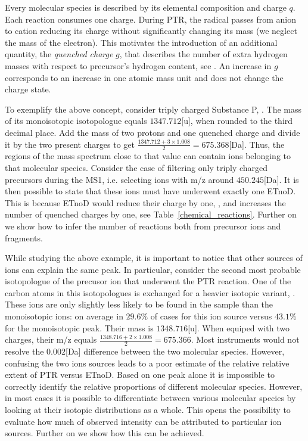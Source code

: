 \documentclass[journal=ancham, manuscript=article, layout=twocolumn]{achemso}
\begin{document}
Every molecular species is described by its elemental composition and charge $q$. 
Each reaction consumes one charge.
During PTR, the radical passes from anion to cation reducing its charge without significantly changing its mass (we neglect the mass of the electron). 
This motivates the introduction of an additional quantity, the \textit{quenched charge} $g$, that describes the number of extra hydrogen masses with respect to precursor's hydrogen content, see \citet{lermyte2015understanding}.
An increase in $g$ corresponds to an increase in one atomic mass unit and does not change the charge state. 

To exemplify the above concept, consider triply charged Substance P, . 
The mass of its monoisotopic isotopologue equals $1347.712$[u], when rounded to the third decimal place.
Add the mass of two protons and one quenched charge and divide it by the two present charges to get $\frac{1347.712 + 3 \times 1.008}{2} = 675.368$[Da].
Thus, the regions of the mass spectrum close to that value can contain ions belonging to that molecular species.
Consider the case of filtering only triply charged precursors during the MS1, i.e. selecting ions with m/z around $450.245$[Da]. 
It is then possible to state that these ions must have underwent exactly one ETnoD.
This is because ETnoD would reduce their charge by one, , and increases the number of quenched charges by one, see Table~\ref{chemical_reactions}.
Further on we show how to infer the number of reactions both from precursor ions and fragments.

While studying the above example, it is important to notice that other sources of ions can explain the same peak.
In particular, consider the second most probable isotopologue of the precusor ion that underwent the PTR reaction.
One of the  carbon atoms in this isotopologues is exchanged for a heavier isotopic variant, . 
These ions are only slightly less likely to be found in the sample than the monoisotopic ions: on average in $29.6\%$ of cases for this ion source versus $43.1\%$ for the monoisotopic peak.
Their mass is $1348.716$[u]. When equiped with two charges, their m/z equals $\frac{1348.716 + 2 \times 1.008}{2} = 675.366$.
Most instruments would not resolve the $0.002$[Da] difference between the two molecular species.  
However, confusing the two ions sources leads to a poor estimate of the relative relative extent of PTR versus ETnoD.  
Based on one peak alone it is impossible to correctly identify the relative proportions of different molecular species.
However, in most cases it is possible to differentiate between various molecular species by looking at their isotopic distributions as a whole.
This opens the possibility to evaluate how much of observed intensity can be attributed to particular ion sources.
Further on we show how this can be achieved.
\end{document}
